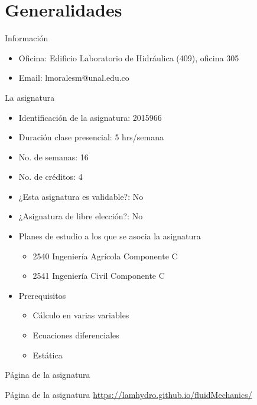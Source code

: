 \documentclass [xcolor=svgnames, t] {beamer}
\begin{document}
\section{Generalidades}
\begin{frame}{Informaci\'on}
\begin{exampleblock}{}
\begin{itemize}
\item \alert{Oficina}: Edificio Laboratorio de Hidr\'aulica (409), oficina 305 
\item \alert{Email}: lmoralesm@unal.edu.co
\end{itemize}
\end{exampleblock}
\end{frame}

\begin{frame}{La asignatura}
\begin{itemize}
\item Identificaci\'on de la asignatura: \alert{2015966}
\item Duraci\'on clase presencial: \alert{5 hrs/semana}
\item No. de semanas: \alert{16}
\item No. de cr\'editos: \alert{4}
\item ¿Esta asignatura es validable?: \alert{No}
\item ¿Asignatura de libre elecci\'on?: \alert{No}
\item Planes de estudio a los que se asocia la asignatura
\begin{itemize}
\item \alert{2540 Ingenier\'ia Agr\'icola Componente C}
\item \alert{2541 Ingenier\'ia Civil Componente C}
\end{itemize}
\item Prerequisitos
\begin{itemize}
\item \alert{C\'alculo en varias variables}
\item \alert{Ecuaciones diferenciales}
\item \alert{Est\'atica}
\end{itemize}
\end{itemize}
\end{frame}

\begin{frame}{P\'agina de la asignatura}
\begin{block}{P\'agina de la asignatura}
\href{https://lamhydro.github.io/fluidMechanics/}{https://lamhydro.github.io/fluidMechanics/}
\end{block}
\end{frame}
\end{document}
